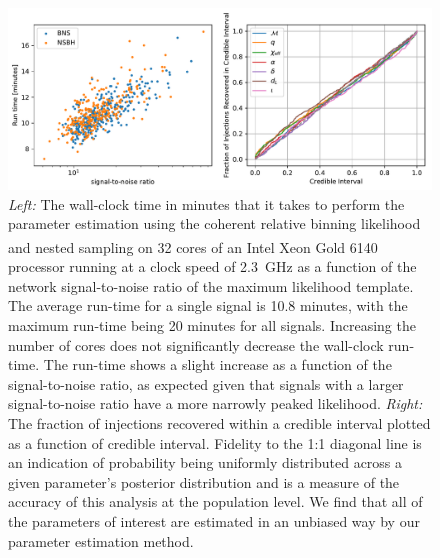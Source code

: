\begin{figure}[b]
\includegraphics[width=\textwidth]{Figures/rel-bin-pe/timing_and_pp_plot.pdf}
\caption{\textit{Left:} The wall-clock time in minutes that it takes to perform the parameter estimation using the coherent relative binning likelihood and nested sampling on 32 cores of an Intel\textsuperscript{\textregistered} Xeon\textsuperscript{\textregistered} Gold 6140 processor running at a clock speed of 2.3~GHz as a function of the network signal-to-noise ratio of the maximum likelihood template. The average run-time for a single signal is 10.8 minutes, with the maximum run-time being 20 minutes for all signals. Increasing the number of cores does not significantly decrease the wall-clock run-time. The run-time shows a slight increase as a function of the signal-to-noise ratio, as expected given that signals with a larger signal-to-noise ratio have a more narrowly peaked likelihood. \textit{Right:} The fraction of injections recovered within a credible interval plotted as a function of credible interval. Fidelity to the 1:1 diagonal line is an indication of probability being uniformly distributed across a given parameter's posterior distribution and is a measure of the accuracy of this analysis at the population level. We find that all of the parameters of interest are estimated in an unbiased way by our parameter estimation method.}
\label{fig:timing_and_pp}
\end{figure}

